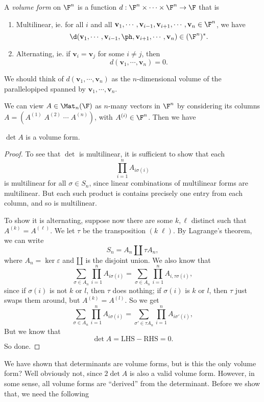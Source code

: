 \documentclass[a4paper]{article}
\begin{document}
\begin{defi}
  A \emph{volume form} on $\F^n$ is a function $d: \F^n \times \cdots \times \F^n \to \F$ that is
  \begin{enumerate}
    \item Multilinear, ie. for all $i$ and all $\mathbf{v}_1, \cdots, \mathbf{v}_{i - 1}, \mathbf{v}_{i + 1}, \cdots, \mathbf{v}_n \in \F^n$, we have
      \[
        \d (\mathbf{v}_1, \cdots, \mathbf{v}_{i - 1}, \ph, \mathbf{v}_{i + 1}, \cdots, \mathbf{v}_n) \in (\F^n)^*.
      \]
    \item Alternating, ie. if $\mathbf{v}_i = \mathbf{v}_j$ for some $i \not= j$, then
      \[
        d(\mathbf{v}_1, \cdots, \mathbf{v}_n) = 0.
      \]
  \end{enumerate}
\end{defi}
We should think of $d(\mathbf{v}_1, \cdots, \mathbf{v}_n)$ as the $n$-dimensional volume of the parallelopiped spanned by $\mathbf{v}_1, \cdots, \mathbf{v}_n$.

We can view $A \in \Mat_n(\F)$ as $n$-many vectors in $\F^n$ by considering its columns $A = (A^{(1)}\; A^{(2)}\; \cdots \; A^{(n)})$, with $A^{(i)} \in \F^n$. Then we have
\begin{lemma}
  $\det A$ is a volume form.
\end{lemma}

\begin{proof}
  To see that $\det$ is multilinear, it is sufficient to show that each
  \[
    \prod_{i = 1}^n A_{i \sigma(i)}
  \]
  is multilinear for all $\sigma \in S_n$, since linear combinations of multilinear forms are multilinear. But each such product is contains precisely one entry from each column, and so is multilinear.

  To show it is alternating, suppose now there are some $k, \ell$ distinct such that $A^{(k)} = A^{(\ell)}$. We let $\tau$ be the transposition $(k\; \ell)$. By Lagrange's theorem, we can write
  \[
    S_n = A_n \amalg \tau A_n,
  \]
  where $A_n = \ker \varepsilon$ and $\amalg$ is the disjoint union. We also know that
  \[
    \sum_{\sigma \in A_n} \prod_{i = 1}^n A_{i \sigma (i)} = \sum_{\sigma \in A_n} \prod_{i = 1}^n A_{i, \tau\sigma(i)},
  \]
  since if $\sigma(i)$ is not $k$ or $l$, then $\tau$ does nothing; if $\sigma(i)$ is $k$ or $l$, then $\tau$ just swaps them around, but $A^{(k)} = A^{(l)}$. So we get
  \[
    \sum_{\sigma \in A_n} \prod_{i = 1}^n A_{i \sigma (i)} = \sum_{\sigma' \in \tau A_n} \prod_{i = 1}^n A_{i\sigma'(i)},
  \]
  But we know that
  \[
    \det A = \text{LHS} - \text{RHS} = 0.
  \]
  So done.
\end{proof}
We have shown that determinants are volume forms, but is this the only volume form? Well obviously not, since $2 \det A$ is also a valid volume form. However, in some sense, all volume forms are ``derived'' from the determinant. Before we show that, we need the following
\end{document}
